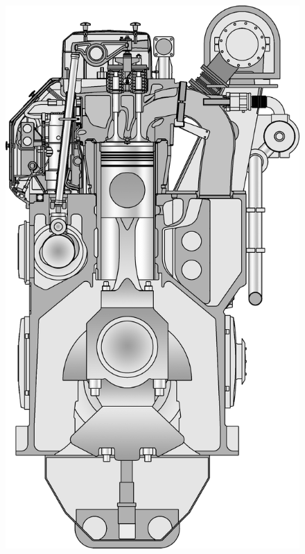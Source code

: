 \documentclass[12pt,a4paper]{article}
\begin{document}
			\begin{figure}[hbtp]
			\centering
			\includegraphics[scale=0.2]{img/8L50DF}
			\end{figure}


\vfill
~
\cleardoublepage

\flushleft
\justifying
\cleardoublepage
\end{document}
